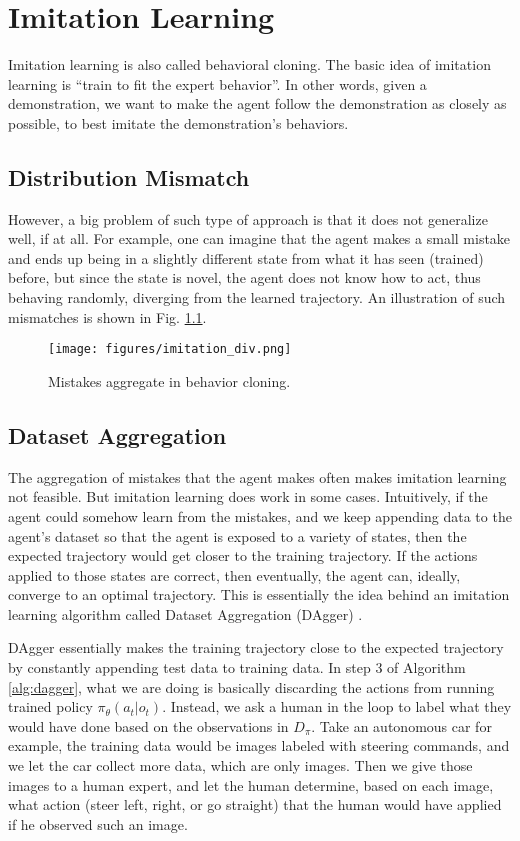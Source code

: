 \chapter{Imitation Learning}
Imitation learning is also called behavioral cloning. The basic idea of imitation learning is ``train to fit the expert behavior''. In other words, given a demonstration, we want to make the agent follow the demonstration as closely as possible, to best imitate the demonstration's behaviors.
\section{Distribution Mismatch}
However, a big problem of such type of approach is that it does not generalize well, if at all. For example, one can imagine that the agent makes a small mistake and ends up being in a slightly different state from what it has seen (trained) before, but since the state is novel, the agent does not know how to act, thus behaving randomly, diverging from the learned trajectory. An illustration of such mismatches is shown in Fig. \ref{fig:imitation_div}.
\begin{figure}
    \centering
    \texttt{[image: figures/imitation\_div.png]}
    \caption{Mistakes aggregate in behavior cloning.}
    \label{fig:imitation_div}
\end{figure}
\section{Dataset Aggregation}
The aggregation of mistakes that the agent makes often makes imitation learning not feasible. But imitation learning does work in some cases. Intuitively, if the agent could somehow learn from the mistakes, and we keep appending data to the agent's dataset so that the agent is exposed to a variety of states, then the expected trajectory would get closer to the training trajectory. If the actions applied to those states are correct, then eventually, the agent can, ideally, converge to an optimal trajectory. This is essentially the idea behind an imitation learning algorithm called Dataset Aggregation (DAgger) \cite{ross2011reduction}.

DAgger essentially makes the training trajectory close to the expected trajectory by constantly appending test data to training data. In step 3 of Algorithm \ref{alg:dagger}, what we are doing is basically discarding the actions from running trained policy $\pi_\theta(a_t|o_t)$. Instead, we ask a human in the loop to label what they would have done based on the observations in $D_\pi$. Take an autonomous car for example, the training data would be images labeled with steering commands, and we let the car collect more data, which are only images. Then we give those images to a human expert, and let the human determine, based on each image, what action (steer left, right, or go straight) that the human would have applied if he observed such an image.

